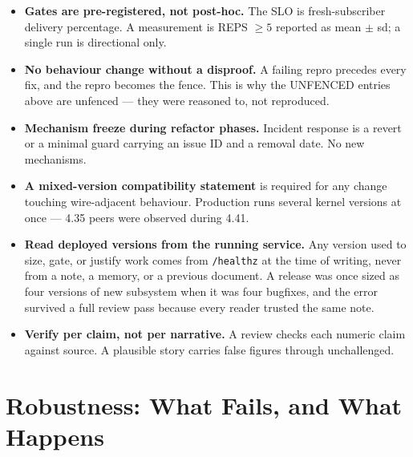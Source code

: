 \documentclass[nobib]{tufte-handout}
\begin{document}
\begin{itemize}
\item \textbf{Gates are pre-registered, not post-hoc.} The SLO is
  fresh-subscriber delivery percentage. A measurement is REPS $\ge 5$
  reported as mean $\pm$ sd; a single run is directional only.
\item \textbf{No behaviour change without a disproof.} A failing repro
  precedes every fix, and the repro becomes the fence. This is why the
  UNFENCED entries above are unfenced --- they were reasoned to, not
  reproduced.
\item \textbf{Mechanism freeze during refactor phases.} Incident
  response is a revert or a minimal guard carrying an issue ID and a
  removal date. No new mechanisms.
\item \textbf{A mixed-version compatibility statement} is required for
  any change touching wire-adjacent behaviour. Production runs several
  kernel versions at once --- 4.35 peers were observed during 4.41.
\item \textbf{Read deployed versions from the running service.} Any
  version used to size, gate, or justify work comes from
  \texttt{/healthz} at the time of writing, never from a note, a memory,
  or a previous document. A release was once sized as four versions of
  new subsystem when it was four bugfixes, and the error survived a full
  review pass because every reader trusted the same note.
\item \textbf{Verify per claim, not per narrative.} A review checks each
  numeric claim against source. A plausible story carries false figures
  through unchallenged.
\end{itemize}

\section{Robustness: What Fails, and What Happens}\label{sec:robustness}
\end{document}
